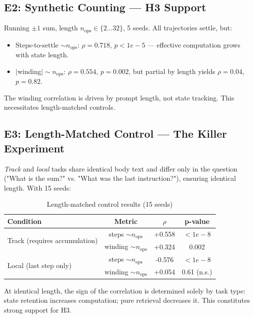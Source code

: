 \subsection{E2: Synthetic Counting — H3 Support}

Running $\pm1$ sum, length $n_{\text{ops}} \in \{2\ldots 32\}$, 5 seeds. All trajectories settle, but:

\begin{itemize}
    \item Steps-to-settle $\sim n_{\text{ops}}$: $\rho = 0.718$, $p < 1e-5$ — effective computation grows with state length.
    \item $|$winding$| \sim n_{\text{ops}}$: $\rho = 0.554$, $p = 0.002$, but partial by length yields $\rho = 0.04$, $p = 0.82$.
\end{itemize}

The winding correlation is driven by prompt length, not state tracking. This necessitates length-matched controls.

\subsection{E3: Length-Matched Control — The Killer Experiment}

\textit{Track} and \textit{local} tasks share identical body text and differ only in the question ("What is the sum?" vs. "What was the last instruction?"), ensuring identical length. With 15 seeds:

\begin{table}[h]
\centering
\caption{Length-matched control results (15 seeds)}
\begin{tabular}{lccc}
\toprule
Condition & Metric & $\rho$ & p-value \\
\midrule
\multirow{2}{*}{Track (requires accumulation)} & steps $\sim n_{\text{ops}}$ & +0.558 & $< 1e-8$ \\
 & winding $\sim n_{\text{ops}}$ & +0.324 & 0.002 \\
\multirow{2}{*}{Local (last step only)} & steps $\sim n_{\text{ops}}$ & -0.576 & $< 1e-8$ \\
 & winding $\sim n_{\text{ops}}$ & +0.054 & 0.61 (n.s.) \\
\bottomrule
\end{tabular}
\end{table}

At identical length, the sign of the correlation is determined solely by task type: state retention increases computation; pure retrieval decreases it. This constitutes strong support for H3.

